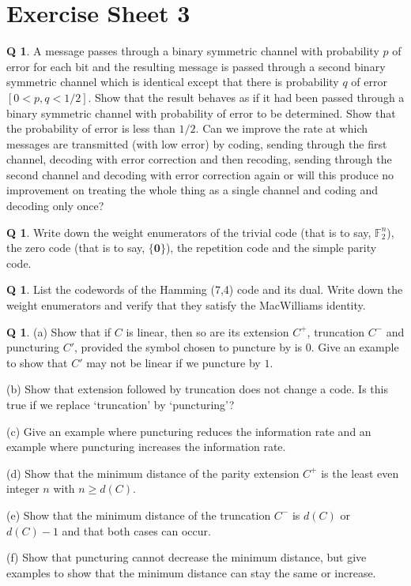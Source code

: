 \documentclass[12pt,a4paper]{article}
\theoremstyle{plain}
\theoremstyle{definition}
\newtheorem{question}[theorem]{Q}
\begin{document}
\newpage
\section{Exercise Sheet 3}
\begin{question}\label{C3.1}
A message passes through a binary symmetric
channel with probability $p$ of error for each bit
and the resulting message is passed  through a 
second binary symmetric
channel which is identical except 
that there is probability $q$ of error $[0<p,q<1/2]$.
Show that the result behaves as if it had been
passed through
a binary symmetric
channel with probability of error to be determined.
Show that the probability of error is less than $1/2$.
Can we improve the rate at which messages are transmitted
(with low error) by coding,
sending through the first channel,
decoding with error correction
and then recoding, sending through the
second channel and decoding 
with error correction again or will this produce
no improvement on treating the whole thing as a single channel
and coding and decoding only once?
\end{question}
\begin{question}\label{C3.2}
Write down the weight enumerators
of the trivial code (that is to say, ${\mathbb F}_{2}^{n}$), the zero code
(that is to say, $\{{\boldsymbol 0}\}$),
the repetition code and the simple
parity code.
\end{question}
\begin{question}\label{C3.3}
List the codewords of the Hamming (7,4)
code and its dual. Write down the weight enumerators and verify
that they satisfy the MacWilliams identity.
\end{question}
\begin{question}\label{C3.4} (a) Show that if $C$ is linear,
then so are its extension $C^{+}$, truncation
$C^{-}$ and puncturing $C'$, provided the symbol
chosen to puncture by is 0. Give an example to show
that $C'$ may not be linear if we puncture by $1$.


(b) Show that extension followed by truncation does not change
a code. Is this true if we replace `truncation' by `puncturing'?

(c) Give an example where puncturing reduces the information
rate and an example where puncturing increases the information
rate.

(d) Show that the minimum distance of
the parity extension $C^{+}$ is the least even
integer $n$ with $n\geq d(C)$.

(e) Show that
the minimum distance of the truncation $C^{-}$ is $d(C)$ or $d(C)-1$
and that both cases can occur.

(f) Show that puncturing cannot decrease the minimum distance,
but give examples to show that the minimum distance can
stay the same or increase.
\end{question}
\end{document}
